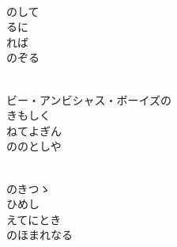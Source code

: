 \documentclass[10pt,b5j]{tarticle} %
\begin{document}
\vspace{1.5em} %
\newcommand{\linespace}{0.5em} %
\newcommand{\blocksize}{0.5\hsize} %
\newcommand{\itemmargin}{3em} %
\begin{enumerate} %
    \setlength{\itemindent}{\itemmargin} %
    \begin{minipage}[c]{\blocksize}
    
        \vspace{\linespace}
        \item~\\
        のして\\
        るに\\
        れば\\
        のぞる
        
    \end{minipage}
    \begin{minipage}[c]{\blocksize}
        
        \vspace{\linespace}
        \item~\\
        ビー・アンビシャス・ボーイズの\\
        きもしく\\
        ねてよぎん\\
        ののとしや
        
    \end{minipage}
    \begin{minipage}[c]{\blocksize}
        
        \vspace{\linespace}
        \item~\\
        のきつゝ\\
        ひめし\\
        えてにとき\\
        のほまれなる
        
    \end{minipage}
    \begin{minipage}[c]{\blocksize}
        

\end{minipage}
\end{enumerate}
\end{document}
